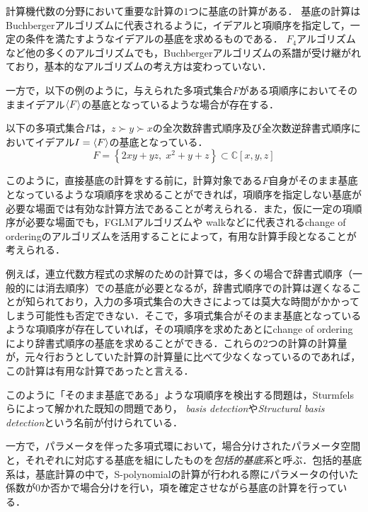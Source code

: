 \phantom{fight!}\par

計算機代数の分野において重要な計算の$1$つに\groebner{}基底の計算がある．
\groebner{}基底の計算はBuchbergerアルゴリズム\cite{buchberger2006bruno}に代表されるように，イデアルと項順序を指定して，一定の条件を満たすようなイデアルの基底を求めるものである．
$F_4$アルゴリズム\cite{faugere1999new}など他の多くのアルゴリズムでも，Buchbergerアルゴリズムの系譜が受け継がれており，基本的なアルゴリズムの考え方は変わっていない．
\par
一方で，以下の例のように，与えられた多項式集合$F$がある項順序においてそのままイデアル$\langle F \rangle$の\groebner{}基底となっているような場合が存在する．
\begin{example*}
	以下の多項式集合$F$は，$z \succ y \succ x$の全次数辞書式順序及び全次数逆辞書式順序においてイデアル$I = \langle F \rangle$の\groebner{}基底となっている．
	$$F = \left\{ 2xy + yz, \; x^2 + y + z \right\} \subset \mathbb{C}[x, y, z]$$
\end{example*}
このように，直接\groebner{}基底の計算をする前に，計算対象である$F$自身がそのまま\groebner{}基底となっているような項順序を求めることができれば，項順序を指定しない\groebner{}基底が必要な場面では有効な計算方法であることが考えられる．また，仮に一定の項順序が必要な場面でも，FGLMアルゴリズム\cite{faugere1993efficient}や\groebner{} walk\cite{collart1993grobner}などに代表されるchange of orderingのアルゴリズムを活用することによって，有用な計算手段となることが考えられる．
\par
例えば，連立代数方程式の求解のための計算では，多くの場合で辞書式順序（一般的には消去順序）での\groebner{}基底が必要となるが，辞書式順序での計算は遅くなることが知られており，入力の多項式集合の大きさによっては莫大な時間がかかってしまう可能性も否定できない．そこで，多項式集合がそのまま\groebner{}基底となっているような項順序が存在していれば，その項順序を求めたあとにchange of orderingにより辞書式順序の\groebner{}基底を求めることができる．これらの$2$つの計算の計算量が，元々行おうとしていた計算の計算量に比べて少なくなっているのであれば，この計算は有用な計算であったと言える．
\par
このように「そのまま\groebner{}基底である」ような項順序を検出する問題は，Sturmfelsらによって解かれた既知の問題であり，\emph{\groebner{} basis detection}\cite{gritzmann1993minkowski}や\emph{Structural \groebner{} basis detection}\cite{sturmfels1997structural}という名前が付けられている．
\par
一方で，パラメータを伴った多項式環において，場合分けされたパラメータ空間と，それぞれに対応する\groebner{}基底を組にしたものを\emph{包括的\groebner{}基底系}\cite{weispfenning1992comprehensive}と呼ぶ．包括的\groebner{}基底系は，\groebner{}基底計算の中で，\textrm{S-polynomial}の計算が行われる際にパラメータの付いた係数が$0$か否かで場合分けを行い，項を確定させながら\groebner{}基底の計算を行っている．
